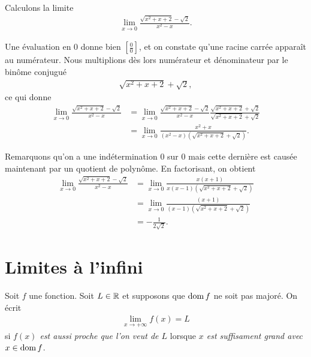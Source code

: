 \documentclass[main.tex]{subfiles}
\begin{document}
\begin{example}

    Calculons la limite
    \begin{align}
        \lim_{x \to 0} \frac {\sqrt{x^2 + x + 2} - \sqrt{2}} {x^2 - x}.
    \end{align}

    Une évaluation en $0$ donne bien $[\frac 0 0]$,
    et on constate qu'une racine carrée apparaît au numérateur.
    Nous multiplions dès lors numérateur et dénominateur par le binôme conjugué
    \begin{align}
        \sqrt {x^2 + x + 2} + \sqrt 2,
    \end{align}
    ce qui donne
    \begin{align}
        \lim_{x \to 0} \frac {\sqrt{x^2 + x + 2} - \sqrt{2}} {x^2 - x}
        &= \lim_{x \to 0} \frac {\sqrt{x^2 + x + 2} - \sqrt{2}} {x^2 - x} \frac {\sqrt {x^2 + x + 2} + \sqrt 2} {\sqrt {x^2 + x + 2} + \sqrt 2}\\
        &= \lim_{x \to 0} \frac {x^2 + x} {(x^2 - x)(\sqrt {x^2 + x + 2} + \sqrt 2)}.
    \end{align}

    Remarquons qu'on a une indétermination $0$ sur $0$
    mais cette dernière est causée maintenant par un quotient de polynôme.
    En factorisant, on obtient
    \begin{align}
        \lim_{x \to 0} \frac {\sqrt{x^2 + x + 2} - \sqrt{2}} {x^2 - x}
        &= \lim_{x \to 0} \frac {x(x + 1)} {x(x - 1)(\sqrt {x^2 + x + 2} + \sqrt 2)}\\
        &= \lim_{x \to 0} \frac {(x + 1)} {(x - 1)(\sqrt {x^2 + x + 2} + \sqrt 2)}\\
        &= -\frac 1 {2 \sqrt 2}.
    \end{align}
\end{example}

\section{Limites à l'infini}

\begin{definition}

    Soit $f$ une fonction.
    Soit $L \in \mathbb{R}$ et supposons que $\operatorname{dom} f$ ne soit pas majoré.
    On écrit
    \begin{align}
        \lim_{x \to +\infty} f(x) = L
    \end{align}
    si \emph{$f(x)$ est aussi proche que l'on veut de $L$}
    lorsque \emph{$x$ est suffisament grand avec $x \in \operatorname{dom} f$}.
\end{definition}
\end{document}
